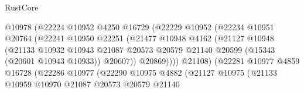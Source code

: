 \begin{lexlean}{RustCore}
\begin{coremodule}
                                        @10978
                                        (@22224
                                          @10952
                                          @4250
                                          @16729
                                          (@22229
                                            @10952
                                            (@22234
                                              @10951
                                              @20764
                                              (@22241
                                                @10950
                                                @22251
                                                (@21477
                                                  @10948
                                                  @4162
                                                  (@21127
                                                    @10948
                                                    (@21133
                                                      @10932
                                                      @10943
                                                      @21087
                                                      @20573
                                                      @20579
                                                      @21140
                                                      @20599
                                                      (@15343 (@20601 @10943 @10933))
                                                      @20607))
                                                  @20869))))
                                          @21108)
                                        (@22281
                                          @10977
                                          @4859
                                          @16728
                                          (@22286
                                            @10977
                                            (@22290
                                              @10975
                                              @4882
                                              (@21127
                                                @10975
                                                (@21133
                                                  @10959
                                                  @10970
                                                  @21087
                                                  @20573
                                                  @20579
                                                  @21140

\end{coremodule}
\end{lexlean}
